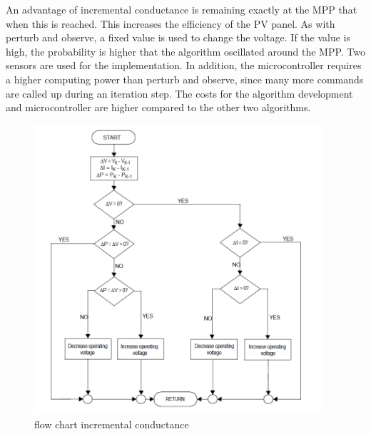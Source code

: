 An advantage of incremental conductance is remaining exactly at the MPP that when this is reached. This increases the efficiency of the PV panel. As with perturb and observe, a fixed value is used to change the voltage. If the value is high, the probability is higher that the algorithm oscillated around the MPP. 
Two sensors are used for the implementation. In addition, the microcontroller requires a higher computing power than perturb and observe, since many more commands are called up during an iteration step. The costs for the algorithm development and microcontroller are higher compared to the other two algorithms\cite{AN1521_MC}.
\begin{figure}[H]
	\begin{center}
		\includegraphics[width=0.95\textwidth]{../Pictures/P1/Flow_chart/flow_chart_incremental_conductance}
		\caption{flow chart incremental conductance \cite{AN1521_MC} }
		\label{fcinccon}
	\end{center}	
\end{figure}

